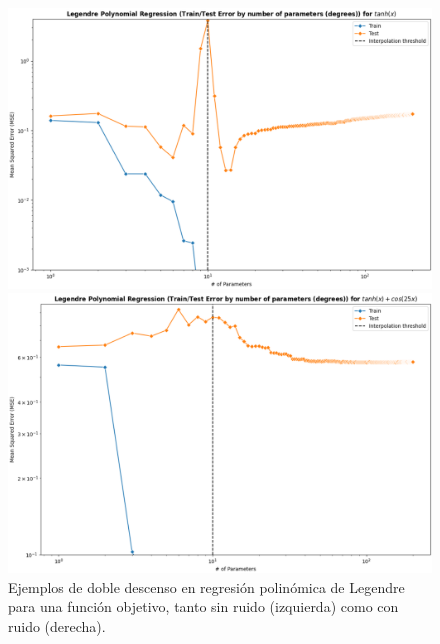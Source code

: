 \begin{figure}[h]
    \centering
    \begin{minipage}{0.4\textwidth}
        \centering
        \includegraphics[width=\linewidth]{img/experiments/hiperbolica_noiselessDDD.png}
    \end{minipage}
    \hfill
    \begin{minipage}{0.4\textwidth}
        \centering
        \includegraphics[width=\linewidth]{img/experiments/hiperbolica_noiseDDD.png}
    \end{minipage}
    \caption[Ejemplos de doble descenso en regresión polinómica de Legendre para una función objetivo, tanto con ruido como sin ruido.]{Ejemplos de doble descenso en regresión polinómica de Legendre para una función objetivo, tanto sin ruido (izquierda) como con ruido (derecha).}\label{fig:legendrehyperbolicDD}
\end{figure}

